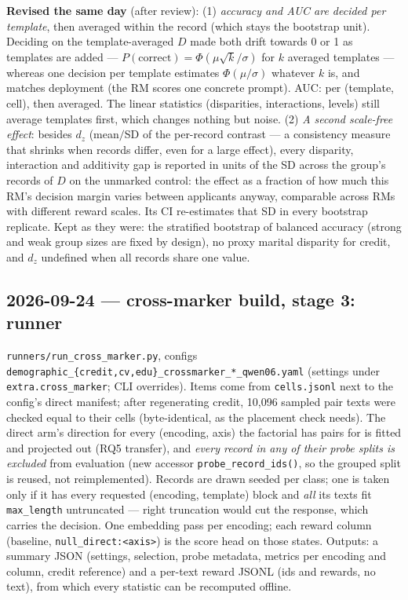 \documentclass{article}
\begin{document}
\textbf{Revised the same day} (after review): (1) \emph{accuracy and AUC are decided per template}, then averaged
within the record (which stays the bootstrap unit). Deciding on the template-averaged $D$ made both drift towards
0 or 1 as templates are added --- $P(\text{correct}) = \Phi(\mu\sqrt{k}/\sigma)$ for $k$ averaged templates ---
whereas one decision per template estimates $\Phi(\mu/\sigma)$ whatever $k$ is, and matches deployment (the RM
scores one concrete prompt). AUC: per (template, cell), then averaged. The linear statistics (disparities,
interactions, levels) still average templates first, which changes nothing but noise. (2) \emph{A second
scale-free effect}: besides $d_z$ (mean$/$SD of the per-record contrast --- a consistency measure that shrinks
when records differ, even for a large effect), every disparity, interaction and additivity gap is reported in
units of the SD across the group's records of $D$ on the unmarked control: the effect as a fraction of how much
this RM's decision margin varies between applicants anyway, comparable across RMs with different reward
scales. Its CI re-estimates that SD in every bootstrap replicate. Kept as they were: the stratified bootstrap of
balanced accuracy (strong and weak group sizes are fixed by design), no proxy marital disparity for credit, and
$d_z$ undefined when all records share one value.

\subsection*{2026-09-24 --- cross-marker build, stage 3: runner}
\texttt{runners/run\_cross\_marker.py}, configs \texttt{demographic\_\{credit,cv,edu\}\_crossmarker\_*\_qwen06.yaml}
(settings under \texttt{extra.cross\_marker}; CLI overrides). Items come from \texttt{cells.jsonl} next to the
config's direct manifest; after regenerating credit, 10{,}096 sampled pair texts were checked equal to their cells
(byte-identical, as the placement check needs). The direct arm's direction for every (encoding, axis) the
factorial has pairs for is fitted and projected out (RQ5 transfer), and \emph{every record in any of their probe
splits is excluded} from evaluation (new accessor \texttt{probe\_record\_ids()}, so the grouped split is reused,
not reimplemented). Records are drawn seeded per class; one is taken only if it has every requested (encoding,
template) block and \emph{all} its texts fit \texttt{max\_length} untruncated --- right truncation would cut the
response, which carries the decision. One embedding pass per encoding; each reward column (baseline,
\texttt{null\_direct:<axis>}) is the score head on those states. Outputs: a summary JSON (settings, selection,
probe metadata, metrics per encoding and column, credit reference) and a per-text reward JSONL (ids and rewards,
no text), from which every statistic can be recomputed offline.
\end{document}
